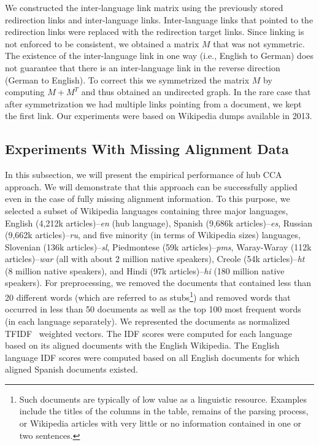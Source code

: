 We constructed the inter-language link matrix using the previously stored redirection links and inter-language links.
Inter-language links that pointed to the redirection links were replaced with the redirection target links. Since linking
is not enforced to be consistent, we obtained a matrix $M$ that was not symmetric. The existence of the inter-language link in
one way (i.e., English to German) does not guarantee that there is an inter-language link in the reverse direction (German to English).
To correct this we symmetrized the matrix $M$ by computing $M+M^T$ and thus obtained an undirected graph. In the rare case that
after symmetrization we had multiple links pointing from a document, we kept the first link. Our experiments were based on 
Wikipedia dumps available in 2013.

\subsection{Experiments With Missing Alignment Data}\label{experiments:hubcca}

In this subsection, we will present the empirical performance of hub CCA approach.
We will demonstrate that this approach can be successfully applied even in the case of
fully missing alignment information.
To this purpose, we selected a subset of Wikipedia languages containing three major languages,
English (4,212k articles)--\emph{en} (hub language), Spanish (9,686k articles)--\emph{es},
Russian (9,662k articles)--\emph{ru}, and five minority (in terms of Wikipedia sizes) languages,
Slovenian (136k articles)--\emph{sl}, Piedmontese (59k articles)--\emph{pms},
Waray-Waray (112k articles)--\emph{war} (all with about 2 million native speakers),
Creole (54k articles)--\emph{ht} (8 million native speakers), and Hindi
(97k articles)--\emph{hi} (180 million native speakers). For preprocessing, we removed the documents that contained
less than 20 different words (which are referred to as stubs\footnote{Such documents are typically of low value as a linguistic resource.
Examples include the titles of the columns in the table, remains of the parsing process,
or Wikipedia articles with very little or no information contained in one or two sentences.}) and removed words that occurred in
less than 50 documents as well as the top 100 most frequent words (in each language separately). We represented the documents as
normalized TFIDF~\cite{Salton88term-weightingapproaches} weighted vectors. The IDF scores were computed for each language based
on its aligned documents with the English Wikipedia. The English language IDF scores were computed based on all English documents
for which aligned Spanish documents existed.


